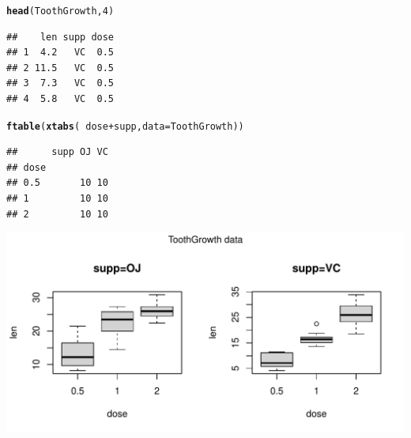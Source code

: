 \documentclass[10pt]{article}\usepackage[]{graphicx}\usepackage[]{color}
\makeatletter
\def\maxwidth{ %
  \ifdim\Gin@nat@width>\linewidth
    \linewidth
  \else
    \Gin@nat@width
  \fi
}
\newcommand{\hlnum}[1]{\textcolor[rgb]{0.686,0.059,0.569}{#1}}%
\newcommand{\hlopt}[1]{\textcolor[rgb]{0,0,0}{#1}}%
\newcommand{\hlstd}[1]{\textcolor[rgb]{0.345,0.345,0.345}{#1}}%
\newcommand{\hlkwc}[1]{\textcolor[rgb]{0.333,0.667,0.333}{#1}}%
\newcommand{\hlkwd}[1]{\textcolor[rgb]{0.737,0.353,0.396}{\textbf{#1}}}%
\newenvironment{kframe}{%
 \def\at@end@of@kframe{}%
 \ifinner\ifhmode%
  \def\at@end@of@kframe{\end{minipage}}%
  \begin{minipage}{\columnwidth}%
 \fi\fi%
 \def\FrameCommand##1{\hskip\@totalleftmargin \hskip-\fboxsep
 \colorbox{shadecolor}{##1}\hskip-\fboxsep
     \hskip-\linewidth \hskip-\@totalleftmargin \hskip\columnwidth}%
 \MakeFramed {\advance\hsize-\width
   \@totalleftmargin\z@ \linewidth\hsize
   \@setminipage}}%
 {\par\unskip\endMakeFramed%
 \at@end@of@kframe}
\newenvironment{knitrout}{}{} %
\makeatother
\begin{document}
\begin{knitrout}
\color{fgcolor}\begin{kframe}
\begin{alltt}
\hlkwd{head}\hlstd{(ToothGrowth,} \hlnum{4}\hlstd{)}
\end{alltt}
\begin{verbatim}
##    len supp dose
## 1  4.2   VC  0.5
## 2 11.5   VC  0.5
## 3  7.3   VC  0.5
## 4  5.8   VC  0.5
\end{verbatim}
\begin{alltt}
\hlkwd{ftable}\hlstd{(}\hlkwd{xtabs}\hlstd{(}\hlopt{~} \hlstd{dose} \hlopt{+} \hlstd{supp,} \hlkwc{data}\hlstd{=ToothGrowth))}
\end{alltt}
\begin{verbatim}
##      supp OJ VC
## dose           
## 0.5       10 10
## 1         10 10
## 2         10 10
\end{verbatim}
\end{kframe}
\end{knitrout}

\begin{knitrout}
\color{fgcolor}
\includegraphics[width=\maxwidth]{figures/LSmeansunnamed-chunk-5-1} 

\end{knitrout}
\end{document}
